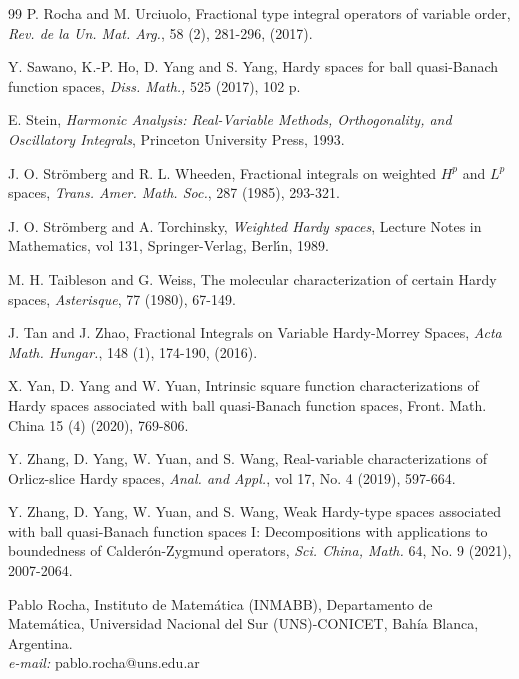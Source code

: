 \documentclass[oneside,10pt]{article}
\begin{document}
\begin{thebibliography}{99}
 P. Rocha and M. Urciuolo, Fractional type integral operators of variable order, \textit{Rev. de la Un. Mat. Arg.}, 58 (2),
281-296, (2017).

 Y. Sawano, K.-P. Ho, D. Yang and S. Yang, Hardy spaces for ball quasi-Banach function spaces, \textit{Diss. Math.,} 525 (2017), 102 p. 

 E. Stein, \textit{Harmonic Analysis: Real-Variable Methods, Orthogonality, and Oscillatory Integrals}, Princeton
University Press, 1993.

  J. O. Str\"omberg and R. L. Wheeden, Fractional integrals on weighted $H^{p}$ and $L^{p}$ spaces, \textit{Trans. Amer. Math. Soc.}, 287 (1985), 293-321.

 J. O. Str\"omberg and A. Torchinsky, \textit{Weighted Hardy spaces}, Lecture Notes in Mathematics, vol 131, Springer-Verlag, Berl\'{\i}n, 1989.

 M. H. Taibleson and G. Weiss, The molecular characterization of certain Hardy spaces, \textit{Asterisque}, 77 (1980), 67-149.

 J. Tan and J. Zhao, Fractional Integrals on Variable Hardy-Morrey Spaces, \textit{Acta Math. Hungar.}, 148 (1), 174-190,
(2016).

 X. Yan, D. Yang and W. Yuan, Intrinsic square function characterizations of Hardy spaces associated with ball quasi-Banach function spaces, Front. Math. China 15 (4) (2020), 769-806.

 Y. Zhang, D. Yang, W. Yuan, and S. Wang, Real-variable characterizations of Orlicz-slice Hardy spaces, 
\textit{Anal. and Appl.}, vol 17, No. 4 (2019), 597-664.

 Y. Zhang, D. Yang, W. Yuan, and S. Wang, Weak Hardy-type spaces associated with ball quasi-Banach function spaces I: Decompositions with applications to boundedness of Calder\'on-Zygmund operators, \textit{Sci. China, Math.} 64, No. 9 (2021), 2007-2064.



\end{thebibliography}


Pablo Rocha, Instituto de Matem\'atica (INMABB), Departamento de Matem\'atica, Universidad Nacional del Sur (UNS)-CONICET, Bah\'ia Blanca, Argentina. \\
{\it e-mail:} pablo.rocha@uns.edu.ar
\end{document}
